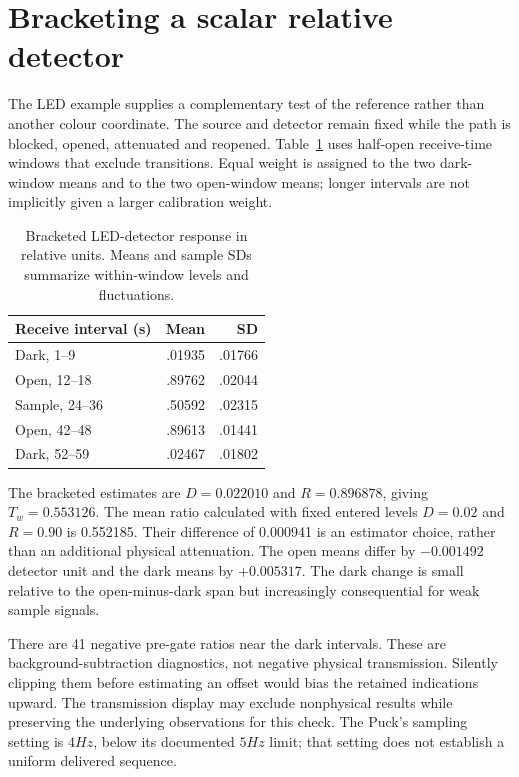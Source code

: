 \section{Bracketing a scalar relative detector}
The LED example supplies a complementary test of the reference rather than another colour coordinate. The source and detector remain fixed while the path is blocked, opened, attenuated and reopened. Table~\ref{tab:light-rgb-brackets} uses half-open receive-time windows that exclude transitions. Equal weight is assigned to the two dark-window means and to the two open-window means; longer intervals are not implicitly given a larger calibration weight.

\begin{table}[!htbp]
\caption{Bracketed LED-detector response in relative units. Means and sample SDs summarize within-window levels and fluctuations.}
\label{tab:light-rgb-brackets}
\centering\footnotesize
\begin{tabular}{@{}lrr@{}}\toprule
Receive interval (s) & Mean & SD\\\midrule
Dark, 1--9 & .01935 & .01766\\
Open, 12--18 & .89762 & .02044\\
Sample, 24--36 & .50592 & .02315\\
Open, 42--48 & .89613 & .01441\\
Dark, 52--59 & .02467 & .01802\\\bottomrule
\end{tabular}
\end{table}

The bracketed estimates are $D=0.022010$ and $R=0.896878$, giving $T_w=0.553126$. The mean ratio calculated with fixed entered levels $D=0.02$ and $R=0.90$ is 0.552185. Their difference of 0.000941 is an estimator choice, rather than an additional physical attenuation. The open means differ by $-0.001492$ detector unit and the dark means by $+0.005317$. The dark change is small relative to the open-minus-dark span but increasingly consequential for weak sample signals.

There are 41 negative pre-gate ratios near the dark intervals. These are background-subtraction diagnostics, not negative physical transmission. Silently clipping them before estimating an offset would bias the retained indications upward. The transmission display may exclude nonphysical results while preserving the underlying observations for this check. The Puck's sampling setting is $4\unit{Hz}$, below its documented $5\unit{Hz}$ limit\cite{pucklight2026}; that setting does not establish a uniform delivered sequence.

